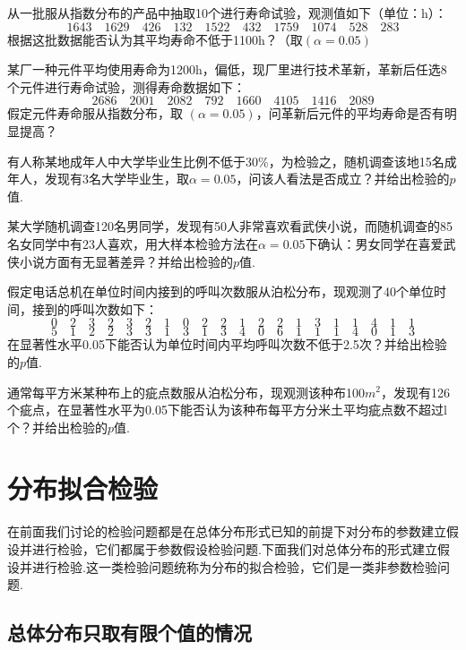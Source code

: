 \begin{xiti}
	\item 从一批服从指数分布的产品中抽取10个进行寿命试验，观测值如下（单位：h）：
	\[1643 \quad 1629 \quad 426 \quad 132 \quad 1522 \quad 432 \quad 1759 \quad 1074 \quad 528 \quad 283\]
	根据这批数据能否认为其平均寿命不低于1100h？（取$(\alpha=0.05)$
		
	\item 某厂一种元件平均使用寿命为1200h，偏低，现厂里进行技术革新，革新后任选8个元件进行寿命试验，测得寿命数据如下：
	\[2686 \quad 2001 \quad 2082 \quad 792 \quad 1660 \quad 4105 \quad 1416 \quad 2089\]
	假定元件寿命服从指数分布，取 $(\alpha=0.05)$，问革新后元件的平均寿命是否有明显提高？
	
	\item 有人称某地成年人中大学毕业生比例不低于30\%，为检验之，随机调查该地15名成年人，发现有3名大学毕业生，取$\alpha=0.05$，问该人看法是否成立？并给出检验的$p$值.
		
	\item 某大学随机调查120名男同学，发现有50人非常喜欢看武侠小说，而随机调查的85名女同学中有23人喜欢，用大样本检验方法在$\alpha=0.05$下确认：男女同学在喜爱武侠小说方面有无显著差异？并给出检验的$p$值.
	
			
	\item 假定电话总机在单位时间内接到的呼叫次数服从泊松分布，现观测了40个单位时间，接到的呼叫次数如下：
	\[0 \quad 2 \quad 3 \quad 2 \quad 3 \quad 2 \quad 1 \quad 0 \quad 2 \quad 2 \quad 1 \quad 2 \quad 2 \quad 1 \quad 3 \quad 1 \quad 1 \quad 4 \quad 1 \quad 1\]
	\[5 \quad 1 \quad 2 \quad 2 \quad 3 \quad 3 \quad 1 \quad 3 \quad 1 \quad 3 \quad 4 \quad 0 \quad 6 \quad 1 \quad 1 \quad 1 \quad 4 \quad 0 \quad 1 \quad 3\]
	在显著性水平0.05下能否认为单位时间内平均呼叫次数不低于2.5次？并给出检验的$p$值.
				
	\item 通常每平方米某种布上的疵点数服从泊松分布，现观测该种布100$m^{2}$，发现有126个疵点，在显著性水平为0.05下能否认为该种布每平方分米土平均疵点数不超过l个？并给出检验的$p$值.
\end{xiti}
\section{分布拟合检验\label{sec:7.4}}
在前面我们讨论的检验问题都是在总体分布形式已知的前提下对分布的参数建立假设并进行检验，它们都属于参数假设检验问题.下面我们对总体分布的形式建立假设并进行检验.这一类检验问题统称为分布的拟合检验，它们是一类非参数检验问题.


\subsection{总体分布只取有限个值的情况\label{sec:7.3.1}}

